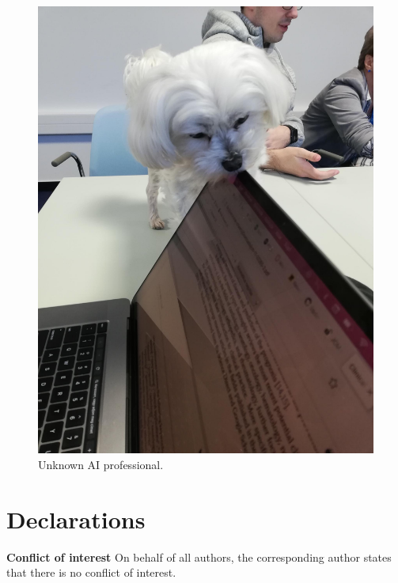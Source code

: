 \documentclass[conference]{IEEEtran}
\begin{document}
\begin{figure}[htbp]
    \begin{center}
    \includegraphics[scale=0.10]{peer_review.png}
    \end{center}
    \caption{Unknown AI professional.}
    \label{aiProf}
\end{figure}

\section*{Declarations}

\textbf{Conflict of interest} On behalf of all authors, the corresponding author
states that there is no conflict of interest.
\end{document}
